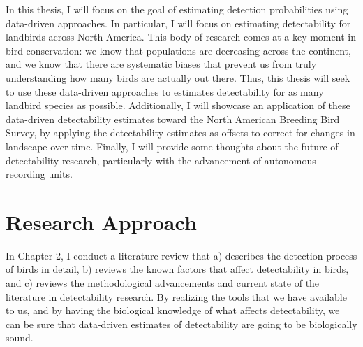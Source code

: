 \par In this thesis, I will focus on the goal of estimating detection probabilities using data-driven approaches.
In particular, I will focus on estimating detectability for landbirds across North America.
This body of research comes at a key moment in bird conservation: we know that populations are decreasing across the continent, and we know that there are systematic biases that prevent us from truly understanding how many birds are actually out there.
Thus, this thesis will seek to use these data-driven approaches to estimates detectability for as many landbird species as possible.
Additionally, I will showcase an application of these data-driven detectability estimates toward the North American Breeding Bird Survey, by applying the detectability estimates as offsets to correct for changes in landscape over time.
Finally, I will provide some thoughts about the future of detectability research, particularly with the advancement of autonomous recording units.

\section{Research Approach}

\par In Chapter 2, I conduct a literature review that a) describes the detection process of birds in detail, b) reviews the known factors that affect detectability in birds, and c) reviews the methodological advancements and current state of the literature in detectability research.
By realizing the tools that we have available to us, and by having the biological knowledge of what affects detectability, we can be sure that data-driven estimates of detectability are going to be biologically sound.

